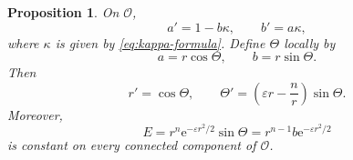 \documentclass[11pt,a4paper]{article}
\numberwithin{equation}{section}
\newtheorem{proposition}[theorem]{Proposition}
\newcommand{\ee}{\mathrm e}
\begin{document}
\begin{proposition}\label{prop:intrinsic-anciaux}
On $\mathcal O$,
\begin{equation}\label{eq:a-b-derivatives}
        a'=1-b\kappa,
        \qquad
        b'=a\kappa,
\end{equation}
where $\kappa$ is given by \eqref{eq:kappa-formula}.  Define $\Theta$ locally by
\begin{equation}\label{eq:theta-a-b}
        a=r\cos\Theta,
        \qquad
        b=r\sin\Theta.
\end{equation}
Then
\begin{equation}\label{eq:intrinsic-anciaux-system}
        r'=\cos\Theta,
        \qquad
        \Theta'=\left(\varepsilon r-\frac nr\right)\sin\Theta.
\end{equation}
Moreover,
\begin{equation}\label{eq:intrinsic-first-integral}
        E=r^n\ee^{-\varepsilon r^2/2}\sin\Theta
        =r^{n-1}b\ee^{-\varepsilon r^2/2}
\end{equation}
is constant on every connected component of $\mathcal O$.
\end{proposition}
\end{document}
